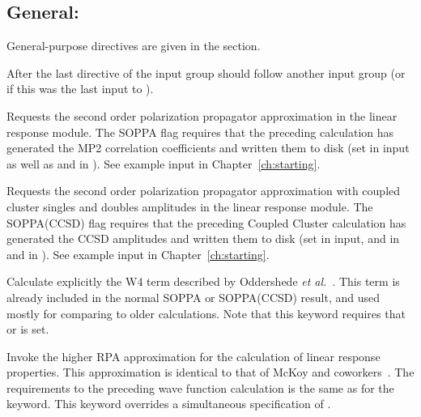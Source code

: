 \subsection{General: }

General-purpose directives are given in the  section.

After the last directive of the  input group
should follow another {} input group
(or  if this was the last input to \dalton).

\begin{description}

\item{}
Requests the second order polarization propagator approximation 
in the linear response module.
The SOPPA
flag requires that
the preceding {\sir} calculation has generated the MP2 correlation
coefficients and written them to disk (set  in 
input as well as  and  in ). See
example input in Chapter~\ref{ch:starting}.

\item{}
Requests the second order polarization propagator approximation with coupled 
cluster singles and doubles amplitudes in the linear response module.
The SOPPA(CCSD)
 flag requires that the preceding Coupled Cluster 
calculation has generated the CCSD amplitudes and written them to disk 
(set  in 
 input,  and  in   and 
 in ). See example input in 
Chapter~\ref{ch:starting}.

\item{}
Calculate explicitly the W4 term described by Oddershede {\it et
al.\/}~\cite{jopjdycpr2}. This term is already included in the normal
SOPPA or 
SOPPA(CCSD) result, and used mostly for comparing to older
calculations. Note that this keyword requires that  or 
is set.

\item{}
Invoke the higher RPA approximation for the calculation of linear
response properties.
This approximation is identical to that of McKoy
and coworkers~\cite{jrtsvmjcp58,tsjrvmjcp58}. The requirements to the
preceding wave function 
calculation is the same as for the  keyword.
This keyword overrides a simultaneous specification of .


\end{description}
